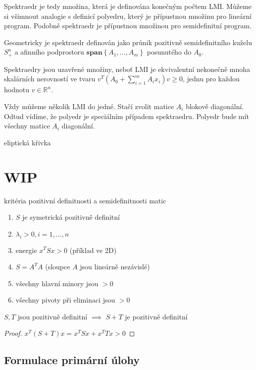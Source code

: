 Spektraedr je tedy množina, která je definována konečným počtem LMI. Můžeme si všimnout analogie s definicí polyedru, který je přípustnou množinu pro lineární program. Podobně spektraedr je přípustnou množinou pro semidefinitní program.

Geometricky je spektraedr definován jako průnik pozitivně semidefinitního kuželu $S_+^n$ a afinního podprostoru $\textbf{span}\left\{ A_1, \dots, A_m \right\}$ posunutého do $A_0$.

Spektraedry jsou uzavřené množiny, neboť LMI je ekvivalentní nekonečně mnoha skalárních nerovností ve tvaru $v^T(A_0 + \sum_{i=1}^m A_ix_i)v \geq 0$, jednu pro každou hodnotu $v \in \mathbb{R}^n$.

Vždy můžeme několik LMI  do jedné. Stačí zvolit matice $A_i$ blokově diagonální. Odtud vídíme, že polyedr je speciálním případem spektraedru. Polyedr bude mít všechny matice $A_i$ diagonální.

\begin{pr}
    eliptická křivka
\end{pr}

\section*{WIP}

kritéria pozitivní definitnosti a semidefinitnosti matic

\begin{enumerate}
    \item $S$ je symetrická pozitivně definitní
    \item $\lambda_i > 0, i=1, \dots, n$
    \item energie $x^TSx > 0$ (příklad ve 2D)
    \item $S = A^TA$ (sloupce $A$ jsou lineárně nezávislé)
    \item všechny hlavní minory jsou $> 0$
    \item všechny pivoty při eliminaci jsou $> 0$
\end{enumerate}


\begin{vt}
$S, T$ jsou pozitivně definitní $\implies$ $S + T$ je pozitivně definitní
\end{vt}

\begin{proof}
$x^T (S+T) x = x^T S x + x^T T x > 0$
\end{proof}

\subsection*{Formulace primární úlohy}


